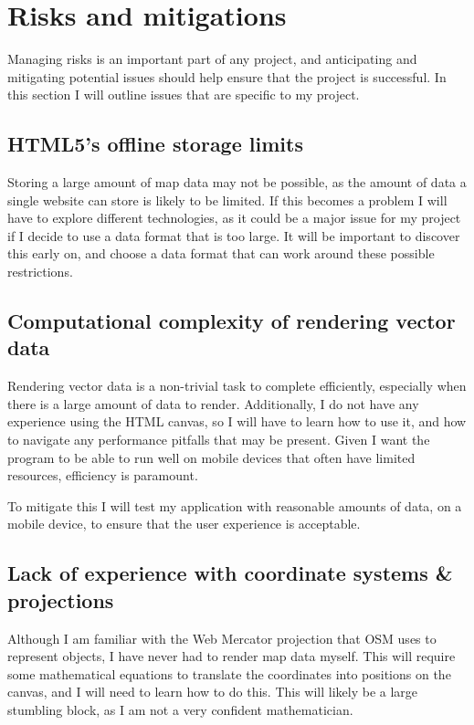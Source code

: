 \documentclass[]{final_report}
\begin{document}
\chapter{Risks and mitigations}

Managing risks is an important part of any project, and anticipating and mitigating potential issues should help ensure that the project is successful. In this section I will outline issues that are specific to my project.

\section{HTML5's offline storage limits}\label{sec:html5-storage-limits}

Storing a large amount of map data may not be possible, as the amount of data a single website can store is likely to be limited. If this becomes a problem I will have to explore different technologies, as it could be a major issue for my project if I decide to use a data format that is too large. It will be important to discover this early on, and choose a data format that can work around these possible restrictions.

\section{Computational complexity of rendering vector data}

Rendering vector data is a non-trivial task to complete efficiently, especially when there is a large amount of data to render. Additionally, I do not have any experience using the HTML canvas, so I will have to learn how to use it, and how to navigate any performance pitfalls that may be present. Given I want the program to be able to run well on mobile devices that often have limited resources, efficiency is paramount.

To mitigate this I will test my application with reasonable amounts of data, on a mobile device, to ensure that the user experience is acceptable. 

\section{Lack of experience with coordinate systems \& projections}\label{sec:coordinate-systems}

Although I am familiar with the Web Mercator projection that OSM uses to represent objects, I have never had to render map data myself. This will require some mathematical equations to translate the coordinates into positions on the canvas, and I will need to learn how to do this. This will likely be a large stumbling block, as I am not a very confident mathematician.
\end{document}
